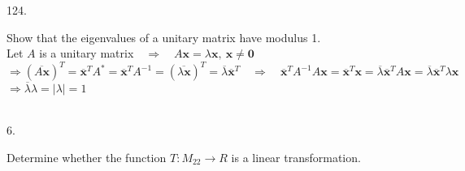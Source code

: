 \documentclass[12pt]{book}
\begin{document}
\begin{CJK}{UTF8}{bsmi}
124. \begin{minipage}[t]{\dimexpr\linewidth-2em}
Show that the eigenvalues of a unitary matrix have modulus 1. \\
Let $A$ is a unitary matrix$\quad\Rightarrow\quad A\textbf{x}=\lambda\textbf{x},\ \textbf{x}\ne\textbf{0}$ \\
$\Rightarrow(\overline{A\textbf{x}})^T=\overline{\textbf{x}}^TA^*=\overline{\textbf{x}}^TA^{-1}=(\overline{\lambda\textbf{x}})^T=\overline{\lambda}\overline{\textbf{x}}^T\quad\Rightarrow\quad\overline{\textbf{x}}^TA^{-1}A\textbf{x}=\overline{\textbf{x}}^T\textbf{x}=\overline{\lambda}\overline{\textbf{x}}^TA\textbf{x}=\overline{\lambda}\overline{\textbf{x}}^T\lambda\textbf{x}$ \\
$\Rightarrow\overline{\lambda}\lambda=\mid\lambda\mid=1$
\end{minipage}\\

6. \begin{minipage}[t]{\dimexpr\linewidth-2em}
Determine whether the function $T:M_{22}\rightarrow R$ is a linear transformation.
\end{minipage}\\


\end{CJK}
\end{document}

